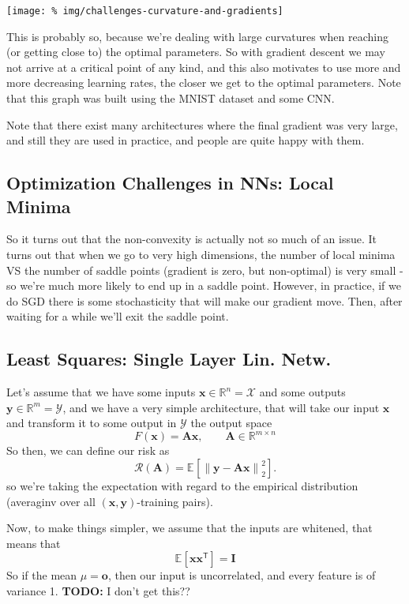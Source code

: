 \documentclass[a2paper,8pt]{extarticle}
\newcommand{\R}{\mathbb{R}}
\newcommand{\cR}{\mathcal{R}}
\newcommand{\cX}{\mathcal{X}}
\newcommand{\cY}{\mathcal{Y}}
\newcommand{\norm}[1]{\left\lVert #1 \right\rVert}
\newcommand{\Exp}[2][]{{\mathbb{E}_{#1}}\left[ #2
\right]}
\newcommand*{\T}{\mathsf{T}}
\newcommand{\mat}[1]{\mathbf{#1}}
\renewcommand{\vec}[1]{\mathbf{#1}}
\newcommand{\vo}{\vec{o}}
\newcommand{\vx}{\vec{x}}
\newcommand{\vy}{\vec{y}}
\newcommand{\MA}{\mat{A}}
\newcommand{\MI}{\mat{I}}
\newcommand{\todo}[1]{\textbf{TODO:} #1}
\newcommand{\todo}[1]{%
}
\newcommand{\ssep}{\hdashrule[1.1ex]{\linewidth}{0.1pt}{0.3mm}\vspace{-6pt}}
\newcommand{\ssep}{\hdashrule[1.1ex]{\linewidth}{0.1pt}{0.3mm}\vspace{-3pt}}
\begin{document}
\begin{landscape}
\begin{multicols*}{7}
\begin{center}
  \texttt{[image: \%
img/challenges-curvature-and-gradients]}
\end{center}

This is probably so, because we're dealing with large curvatures when reaching
(or getting close to) the optimal parameters. So with gradient descent we may
not arrive at a critical point of any kind, and this also motivates to use more
and more decreasing learning rates, the closer we get to the optimal parameters.
Note that this graph was built using the MNIST dataset and some CNN.

Note that there exist many architectures where the final gradient was very
large, and still they are used in practice, and people are quite happy with
them.

\subsection{Optimization Challenges in NNs: Local Minima}


So it turns out that the non-convexity is actually not so much of an issue. It
turns out that when we go to very high dimensions, the number of local minima VS
the number of saddle points (gradient is zero, but non-optimal) is very small -
so we're much more likely to end up in a saddle point. However, in practice, if
we do SGD there is some stochasticity that will make our gradient move. Then,
after waiting for a while we'll exit the saddle point.


\subsection{Least Squares: Single Layer Lin. Netw.}

Let's assume that we have some inputs $\vx\in\R^n=\cX$ and some outputs
$\vy\in\R^m=\cY$, and we have a very simple architecture, that will take our
input $\vx$ and transform it to some output in $\cY$ the output space
\[
F(\vx)=\MA\vx, \qquad \MA\in\R^{m\times n}
\]
So then, we can define our risk as
\[
\cR(\MA)=\Exp{\norm{\vy-\MA\vx}_2^2}.
\]
so we're taking the expectation with regard to the empirical distribution
(averaginv over all $(\vx,\vy)$-training pairs).

\ssep

Now, to make things simpler, we assume that the inputs are whitened, that means
that
\[
\Exp{\vx\vx^\T}=\MI
\]
So if the mean $\mu=\vo$, then our input is uncorrelated, and every feature is
of variance 1.
\todo{I don't get this??}


\end{multicols*}
\end{landscape}
\end{document}
